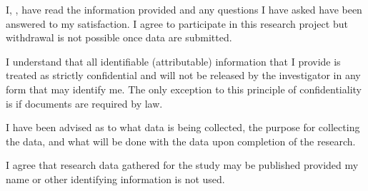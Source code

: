 \documentclass{uwa-pcf}
\author{John Smith}
\begin{document}
I, \theparticipant, have read the information provided and any
questions I have asked have been answered to my satisfaction. I agree
to participate in this research project but withdrawal is not possible
once data are submitted.

I understand that all identifiable (attributable) information that I
provide is treated as strictly confidential and will not be released
by the investigator in any form that may identify me. The only
exception to this principle of confidentiality is if documents are
required by law.

I have been advised as to what data is being collected, the purpose
for collecting the data, and what will be done with the data upon
completion of the research.

I agree that research data gathered for the study may be published
provided my name or other identifying information is not used.
\end{document}
